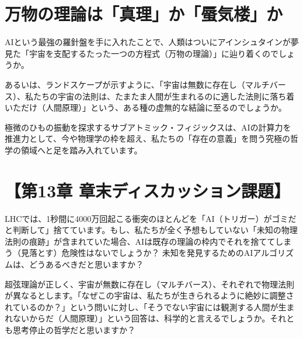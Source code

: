 \section{万物の理論は「真理」か「蜃気楼」か}

AIという最強の羅針盤を手に入れたことで、人類はついにアインシュタインが夢見た「宇宙を支配するたった一つの方程式（万物の理論）」に辿り着くのでしょうか。

あるいは、ランドスケープが示すように、「宇宙は無数に存在し（マルチバース）、私たちの宇宙の法則は、たまたま人間が生まれるのに適した法則に落ち着いただけ（人間原理）」という、ある種の虚無的な結論に至るのでしょうか。

極微のひもの振動を探求するサブアトミック・フィジックスは、AIの計算力を推進力として、今や物理学の枠を超え、私たちの「存在の意義」を問う究極の哲学の領域へと足を踏み入れています。

\section*{【第13章 章末ディスカッション課題】}

LHCでは、1秒間に4000万回起こる衝突のほとんどを「AI（トリガー）がゴミだと判断して」捨てています。もし、私たちが全く予想もしていない「未知の物理法則の痕跡」が含まれていた場合、AIは既存の理論の枠内でそれを捨ててしまう（見落とす）危険性はないでしょうか？ 未知を発見するためのAIアルゴリズムは、どうあるべきだと思いますか？

超弦理論が正しく、宇宙が無数に存在し（マルチバース）、それぞれで物理法則が異なるとします。「なぜこの宇宙は、私たちが生きられるように絶妙に調整されているのか？」という問いに対し、「そうでない宇宙には観測する人間が生まれないからだ（人間原理）」という回答は、科学的と言えるでしょうか。それとも思考停止の哲学だと思いますか？




